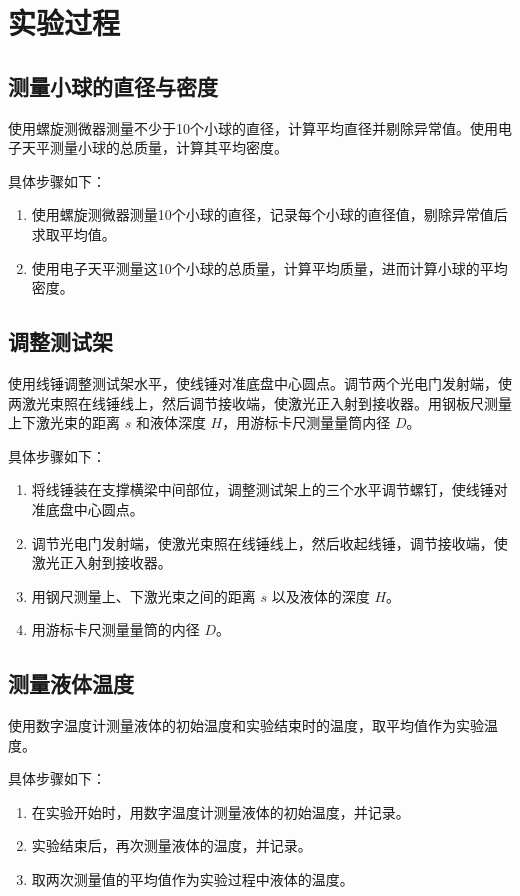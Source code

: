 \documentclass[UTF8]{ctexart}
\begin{document}
\section{实验过程}

\subsection{测量小球的直径与密度}
使用螺旋测微器测量不少于10个小球的直径，计算平均直径并剔除异常值。使用电子天平测量小球的总质量，计算其平均密度。

具体步骤如下：
\begin{enumerate}
    \item 使用螺旋测微器测量10个小球的直径，记录每个小球的直径值，剔除异常值后求取平均值。
    \item 使用电子天平测量这10个小球的总质量，计算平均质量，进而计算小球的平均密度。
\end{enumerate}

\subsection{调整测试架}
使用线锤调整测试架水平，使线锤对准底盘中心圆点。调节两个光电门发射端，使两激光束照在线锤线上，然后调节接收端，使激光正入射到接收器。用钢板尺测量上下激光束的距离 \(s\) 和液体深度 \(H\)，用游标卡尺测量量筒内径 \(D\)。

具体步骤如下：
\begin{enumerate}
    \item 将线锤装在支撑横梁中间部位，调整测试架上的三个水平调节螺钉，使线锤对准底盘中心圆点。
    \item 调节光电门发射端，使激光束照在线锤线上，然后收起线锤，调节接收端，使激光正入射到接收器。
    \item 用钢尺测量上、下激光束之间的距离 \(s\) 以及液体的深度 \(H\)。
    \item 用游标卡尺测量量筒的内径 \(D\)。
\end{enumerate}

\subsection{测量液体温度}
使用数字温度计测量液体的初始温度和实验结束时的温度，取平均值作为实验温度。

具体步骤如下：
\begin{enumerate}
    \item 在实验开始时，用数字温度计测量液体的初始温度，并记录。
    \item 实验结束后，再次测量液体的温度，并记录。
    \item 取两次测量值的平均值作为实验过程中液体的温度。
\end{enumerate}
\end{document}
